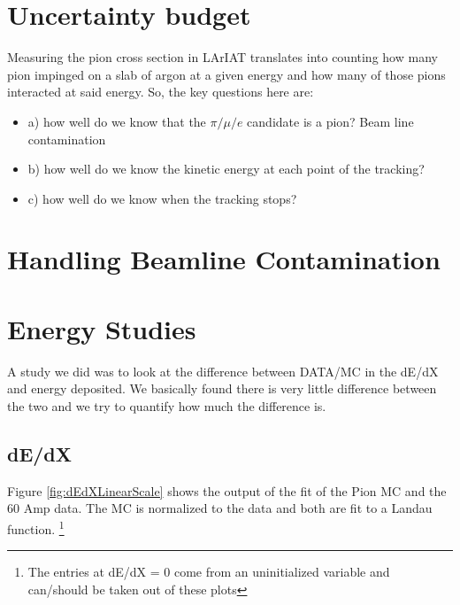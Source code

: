 \section{Uncertainty budget}\label{ch:Uncertainty}
Measuring the pion cross section  in LArIAT translates into counting how many pion impinged on a slab of argon at a given energy and how many of those pions interacted at said energy. So, the key questions here are:
\begin{itemize}
\item[]a) how well do we know that the $\pi/\mu/e$ candidate is a pion? Beam line contamination
\item[]b) how well do we know the kinetic energy at each point of the tracking? %
\item[]c) how well do we know when the tracking stops? %
\end{itemize}


\section{Handling Beamline Contamination}


\section{Energy Studies}

A study we did was to look at the difference between DATA/MC in the dE/dX and energy deposited. We basically found there is very little difference between the two and we try to quantify how much the difference is.

\subsection{dE/dX}
Figure \ref{fig:dEdXLinearScale} shows the output of the fit of the Pion MC and the 60 Amp data. The MC is normalized to the data and both are fit to a Landau function. \footnote{The entries at dE/dX = 0 come from an uninitialized variable and can/should be taken out of these plots}

